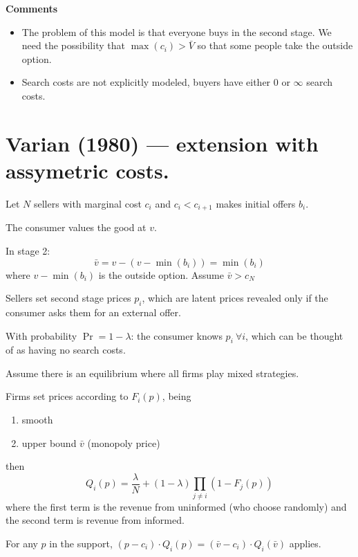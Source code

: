\documentclass[12pt]{article}
\theoremstyle{plain}
\theoremstyle{plain}
\begin{document}
\textbf{Comments}
\begin{itemize}
    \item The problem of this model is that everyone buys in the second stage. We need the possibility that $\max(c_i) > \bar{V}$ so that some people take the outside option.

    \item Search costs are not explicitly modeled, buyers have either 0 or $\infty$ search costs. 
\end{itemize}





 

 \section*{Varian (1980) --- extension with assymetric costs. }


 
Let $N$ sellers with marginal cost $c_i$ and $c_i < c_{i+1}$  makes initial offers $b_i$. 

The consumer values the good at $v$.

In stage 2:
\[
\bar{v} = v - (v - \min(b_i)) = \min(b_i)
\]
where $v - \min(b_i)$ is the outside option. Assume $\bar{v}>c_N$

Sellers set second stage prices $p_i$, which are latent prices revealed only if the consumer asks them for an external offer.

With probability $\Pr = 1- \lambda$: the consumer knows $p_i\ \forall i$, which can be thought of as having no search costs.

Assume there is an equilibrium where all firms play mixed strategies. 

 Firms set prices according to $F_i(p)$, being
\begin{enumerate}
    \item smooth
    \item upper bound $\bar{v} $ (monopoly price)
\end{enumerate}
then 
\[
Q_i(p) = \frac{\lambda}{N} +  (1 - \lambda) \prod_{j\neq i} \left(1 - F_j(p)\right)
\]
where the first term is the revenue from uninformed (who choose randomly) and the second term is revenue from informed. 

For any $p$ in the support, $(p - c_i) \cdot Q_i(p) = (\bar{v}-c_i) \cdot Q_i(\bar{v})$ applies. 
\end{document}
